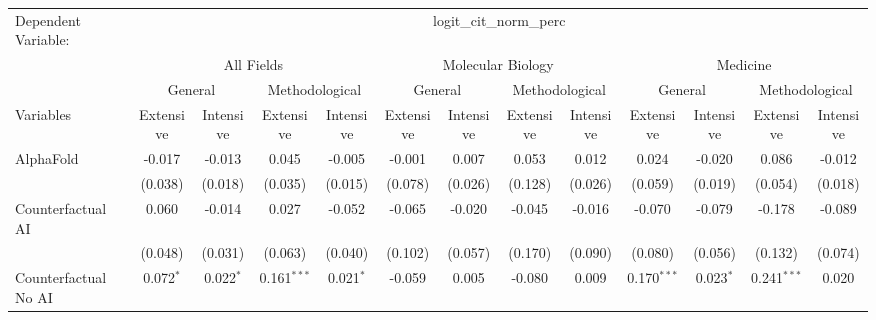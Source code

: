 \begingroup
\centering
\begin{tabular}{lcccccccccccc}
   \tabularnewline \midrule \midrule
   Dependent Variable: & \multicolumn{12}{c}{logit\_cit\_norm\_perc}\\
 & \multicolumn{4}{c}{All Fields} & \multicolumn{4}{c}{Molecular Biology} & \multicolumn{4}{c}{Medicine} \\
\cmidrule(lr){2-5} \cmidrule(lr){6-9} \cmidrule(lr){10-13}
 & \multicolumn{2}{c}{General} & \multicolumn{2}{c}{Methodological} & \multicolumn{2}{c}{General} & \multicolumn{2}{c}{Methodological} & \multicolumn{2}{c}{General} & \multicolumn{2}{c}{Methodological} \\
\cmidrule(lr){2-3} \cmidrule(lr){4-5} \cmidrule(lr){6-7} \cmidrule(lr){8-9} \cmidrule(lr){10-11} \cmidrule(lr){12-13}
Variables & \multicolumn{1}{c}{Extensive} & \multicolumn{1}{c}{Intensive} & \multicolumn{1}{c}{Extensive} & \multicolumn{1}{c}{Intensive} & \multicolumn{1}{c}{Extensive} & \multicolumn{1}{c}{Intensive} & \multicolumn{1}{c}{Extensive} & \multicolumn{1}{c}{Intensive} & \multicolumn{1}{c}{Extensive} & \multicolumn{1}{c}{Intensive} & \multicolumn{1}{c}{Extensive} & \multicolumn{1}{c}{Intensive} \\
\cmidrule(lr){1-1}\cmidrule(lr){2-2} \cmidrule(lr){3-3} \cmidrule(lr){4-4} \cmidrule(lr){5-5} \cmidrule(lr){6-6} \cmidrule(lr){7-7} \cmidrule(lr){8-8} \cmidrule(lr){9-9} \cmidrule(lr){10-10} \cmidrule(lr){11-11} \cmidrule(lr){12-12} \cmidrule(lr){13-13}
   AlphaFold                                & -0.017       & -0.013      & 0.045         & -0.005      & -0.001  & 0.007   & 0.053   & 0.012   & 0.024         & -0.020         & 0.086         & -0.012\\   
                                            & (0.038)      & (0.018)     & (0.035)       & (0.015)     & (0.078) & (0.026) & (0.128) & (0.026) & (0.059)       & (0.019)        & (0.054)       & (0.018)\\   
   Counterfactual AI                        & 0.060        & -0.014      & 0.027         & -0.052      & -0.065  & -0.020  & -0.045  & -0.016  & -0.070        & -0.079         & -0.178        & -0.089\\   
                                            & (0.048)      & (0.031)     & (0.063)       & (0.040)     & (0.102) & (0.057) & (0.170) & (0.090) & (0.080)       & (0.056)        & (0.132)       & (0.074)\\   
   Counterfactual No AI                     & 0.072$^{*}$  & 0.022$^{*}$ & 0.161$^{***}$ & 0.021$^{*}$ & -0.059  & 0.005   & -0.080  & 0.009   & 0.170$^{***}$ & 0.023$^{*}$    & 0.241$^{***}$ & 0.020\\   

\end{tabular}
